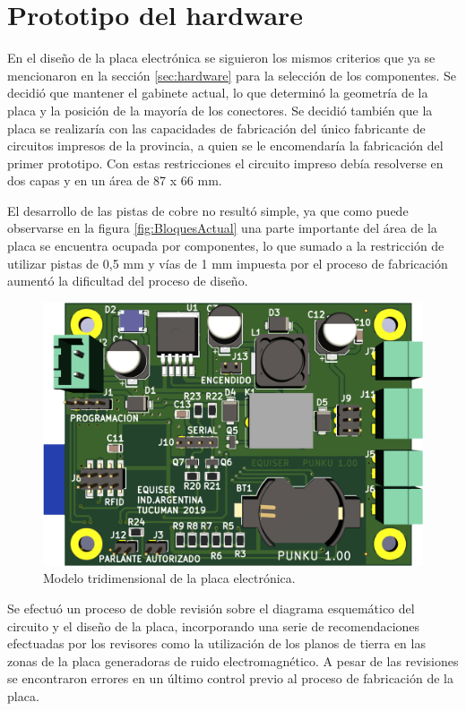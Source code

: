 \section{Prototipo del hardware}
\label{sec:prototipo}

En el diseño de la placa electrónica se siguieron los mismos criterios que ya se mencionaron en la sección \ref{sec:hardware} para la selección de los componentes. Se decidió que mantener el gabinete actual, lo que determinó la geometría de la placa y la posición de la mayoría de los conectores. Se decidió también que la placa se realizaría con las capacidades de fabricación del único fabricante de circuitos impresos de la provincia, a quien se le encomendaría la fabricación del primer prototipo. Con estas restricciones el circuito impreso debía resolverse en dos capas y en un área de 87 x 66 mm. 

El desarrollo de las pistas de cobre no resultó simple, ya que como puede observarse en la figura \ref{fig:BloquesActual} una parte importante del área de la placa se encuentra ocupada por componentes, lo que sumado a la restricción de utilizar pistas de 0,5 mm y vías de 1 mm impuesta por el proceso de fabricación aumentó la dificultad del proceso de diseño. 

\begin{figure}[ht]
	\centering
	\includegraphics[scale=.15]{Figures/ModeloPlaca.png}
	\caption{Modelo tridimensional de la placa electrónica.}
	\label{fig:Componentes}
\end{figure}

Se efectuó un proceso de doble revisión sobre el diagrama esquemático del circuito y el diseño de la placa, incorporando una serie de recomendaciones efectuadas por los revisores como la utilización de los planos de tierra en las zonas de la placa generadoras de ruido electromagnético. A pesar de las revisiones se encontraron errores en un último control previo al proceso de fabricación de la placa.


